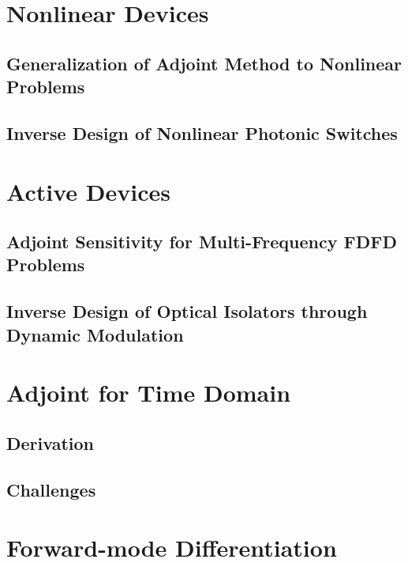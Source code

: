 \section{Nonlinear Devices}

\subsection{Generalization of Adjoint Method to Nonlinear Problems}

\subsection{Inverse Design of Nonlinear Photonic Switches}

\section{Active Devices}

\subsection{Adjoint Sensitivity for Multi-Frequency FDFD Problems}

\subsection{Inverse Design of Optical Isolators through Dynamic Modulation}

\section{Adjoint for Time Domain}

\subsection{Derivation}

\subsection{Challenges}

\section{Forward-mode Differentiation}
